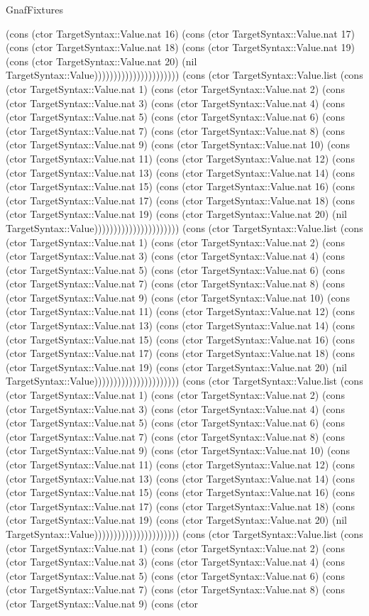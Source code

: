 \begin{lexlean}{GnafFixtures}
\begin{semanticmodule}
{(cons (ctor TargetSyntax::Value.nat 16) (cons (ctor TargetSyntax::Value.nat 17) (cons (ctor TargetSyntax::Value.nat 18) (cons (ctor TargetSyntax::Value.nat 19) (cons (ctor TargetSyntax::Value.nat 20) (nil TargetSyntax::Value)))))))))))))))))))))) (cons (ctor TargetSyntax::Value.list (cons (ctor TargetSyntax::Value.nat 1) (cons (ctor TargetSyntax::Value.nat 2) (cons (ctor TargetSyntax::Value.nat 3) (cons (ctor TargetSyntax::Value.nat 4) (cons (ctor TargetSyntax::Value.nat 5) (cons (ctor TargetSyntax::Value.nat 6) (cons (ctor TargetSyntax::Value.nat 7) (cons (ctor TargetSyntax::Value.nat 8) (cons (ctor TargetSyntax::Value.nat 9) (cons (ctor TargetSyntax::Value.nat 10) (cons (ctor TargetSyntax::Value.nat 11) (cons (ctor TargetSyntax::Value.nat 12) (cons (ctor TargetSyntax::Value.nat 13) (cons (ctor TargetSyntax::Value.nat 14) (cons (ctor TargetSyntax::Value.nat 15) (cons (ctor TargetSyntax::Value.nat 16) (cons (ctor TargetSyntax::Value.nat 17) (cons (ctor TargetSyntax::Value.nat 18) (cons (ctor TargetSyntax::Value.nat 19) (cons (ctor TargetSyntax::Value.nat 20) (nil TargetSyntax::Value)))))))))))))))))))))) (cons (ctor TargetSyntax::Value.list (cons (ctor TargetSyntax::Value.nat 1) (cons (ctor TargetSyntax::Value.nat 2) (cons (ctor TargetSyntax::Value.nat 3) (cons (ctor TargetSyntax::Value.nat 4) (cons (ctor TargetSyntax::Value.nat 5) (cons (ctor TargetSyntax::Value.nat 6) (cons (ctor TargetSyntax::Value.nat 7) (cons (ctor TargetSyntax::Value.nat 8) (cons (ctor TargetSyntax::Value.nat 9) (cons (ctor TargetSyntax::Value.nat 10) (cons (ctor TargetSyntax::Value.nat 11) (cons (ctor TargetSyntax::Value.nat 12) (cons (ctor TargetSyntax::Value.nat 13) (cons (ctor TargetSyntax::Value.nat 14) (cons (ctor TargetSyntax::Value.nat 15) (cons (ctor TargetSyntax::Value.nat 16) (cons (ctor TargetSyntax::Value.nat 17) (cons (ctor TargetSyntax::Value.nat 18) (cons (ctor TargetSyntax::Value.nat 19) (cons (ctor TargetSyntax::Value.nat 20) (nil TargetSyntax::Value)))))))))))))))))))))) (cons (ctor TargetSyntax::Value.list (cons (ctor TargetSyntax::Value.nat 1) (cons (ctor TargetSyntax::Value.nat 2) (cons (ctor TargetSyntax::Value.nat 3) (cons (ctor TargetSyntax::Value.nat 4) (cons (ctor TargetSyntax::Value.nat 5) (cons (ctor TargetSyntax::Value.nat 6) (cons (ctor TargetSyntax::Value.nat 7) (cons (ctor TargetSyntax::Value.nat 8) (cons (ctor TargetSyntax::Value.nat 9) (cons (ctor TargetSyntax::Value.nat 10) (cons (ctor TargetSyntax::Value.nat 11) (cons (ctor TargetSyntax::Value.nat 12) (cons (ctor TargetSyntax::Value.nat 13) (cons (ctor TargetSyntax::Value.nat 14) (cons (ctor TargetSyntax::Value.nat 15) (cons (ctor TargetSyntax::Value.nat 16) (cons (ctor TargetSyntax::Value.nat 17) (cons (ctor TargetSyntax::Value.nat 18) (cons (ctor TargetSyntax::Value.nat 19) (cons (ctor TargetSyntax::Value.nat 20) (nil TargetSyntax::Value)))))))))))))))))))))) (cons (ctor TargetSyntax::Value.list (cons (ctor TargetSyntax::Value.nat 1) (cons (ctor TargetSyntax::Value.nat 2) (cons (ctor TargetSyntax::Value.nat 3) (cons (ctor TargetSyntax::Value.nat 4) (cons (ctor TargetSyntax::Value.nat 5) (cons (ctor TargetSyntax::Value.nat 6) (cons (ctor TargetSyntax::Value.nat 7) (cons (ctor TargetSyntax::Value.nat 8) (cons (ctor TargetSyntax::Value.nat 9) (cons (ctor }
\end{semanticmodule}
\end{lexlean}
